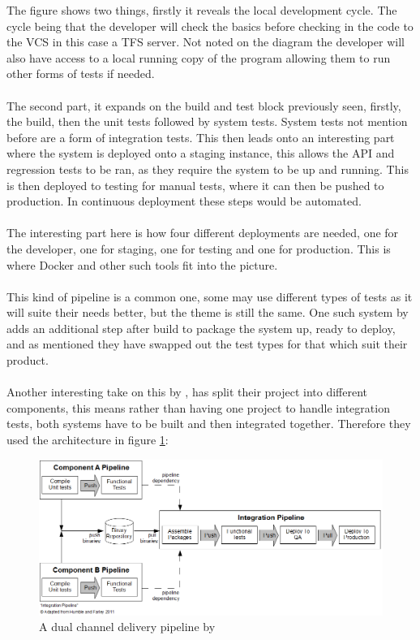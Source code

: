 The figure shows two things, firstly it reveals the local development cycle. The cycle being that the developer will check the basics before checking in the code to the VCS in this case a TFS server. Not noted on the diagram the developer will also have access to a local running copy of the program allowing them to run other forms of tests if needed. 
\\\\
The second part, it expands on the build and test block previously seen, firstly, the build, then the unit tests followed by system tests. System tests not mention before are a form of integration tests. This then leads onto an interesting part where the system is deployed onto a staging instance, this allows the API and regression tests to be ran, as they require the system to be up and running. This is then deployed to testing  for manual tests, where it can then be pushed to production. In continuous deployment these steps would be automated.
\\\\
The interesting part here is how four different deployments are needed, one for the developer, one for staging, one for testing and one for production. This is where Docker and other such tools fit into the picture.
\\\\
This kind of pipeline is a common one, some may use different types of tests as it will suite their needs better, but the theme is still the same. One such system by \cite{zend} adds an additional step after build to package the system up, ready to deploy, and as mentioned they have swapped out the test types for that which suit their product.
\\\\
Another interesting take on this by \cite{codeahoy}, has split their project into different components, this means rather than having one project to handle integration tests, both systems have to be built and then integrated together. Therefore they used the architecture in figure \ref{fig:codeahoy}:

\begin{figure}[H]
	\centering
	\includegraphics[scale=0.5]{images/codeahoy.png}
	\caption{A dual channel delivery pipeline by \cite{codeahoy}}
	\label{fig:codeahoy}
\end{figure}

